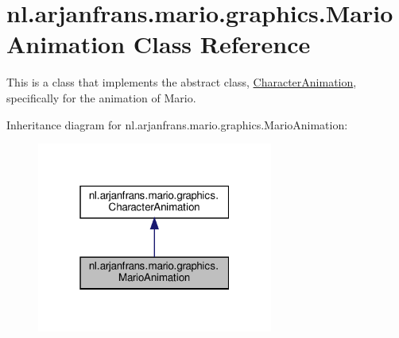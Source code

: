 \hypertarget{classnl_1_1arjanfrans_1_1mario_1_1graphics_1_1MarioAnimation}{}\section{nl.\+arjanfrans.\+mario.\+graphics.\+Mario\+Animation Class Reference}
\label{classnl_1_1arjanfrans_1_1mario_1_1graphics_1_1MarioAnimation}


This is a class that implements the abstract class, \hyperlink{classnl_1_1arjanfrans_1_1mario_1_1graphics_1_1CharacterAnimation}{Character\+Animation}, specifically for the animation of Mario.  




Inheritance diagram for nl.\+arjanfrans.\+mario.\+graphics.\+Mario\+Animation\+:
\nopagebreak
\begin{figure}[H]
\begin{center}
\leavevmode
\includegraphics[width=220pt]{classnl_1_1arjanfrans_1_1mario_1_1graphics_1_1MarioAnimation__inherit__graph}
\end{center}
\end{figure}


